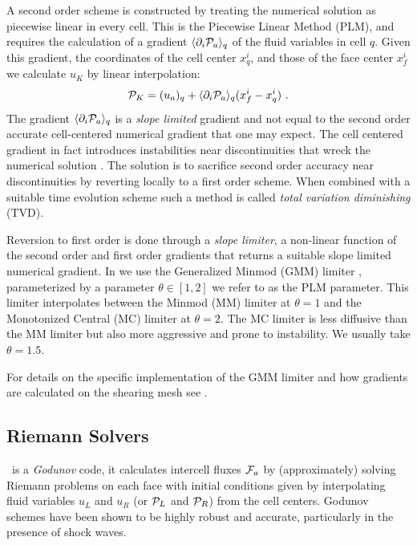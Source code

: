 A second order scheme is constructed by treating the numerical solution as piecewise linear in every cell.  This is the Piecewise Linear Method (PLM), and requires the calculation of a gradient $\langle \partial_i \mathcal{P}_a \rangle_q$ of the fluid variables in cell $q$.  Given this gradient, the coordinates of the cell center $x^i_q$, and those of the face center $x^i_f$ we calculate $u_K$ by linear interpolation:
\begin{equation}
	\PP_K = (u_a)_q + \langle \partial_i \PP_a \rangle_q (x^i_f - x^i_q)\ . \eqlabel{PLM}
\end{equation}
The gradient $\langle \partial_i \mathcal{P}_a \rangle_q$ is a \emph{slope limited} gradient and not equal to the second order accurate cell-centered numerical gradient that one may expect.  The cell centered gradient in fact introduces instabilities near discontinuities that wreck the numerical solution \citep{vanLeer74}.  The solution is to sacrifice second order accuracy near discontinuities by reverting locally to a first order scheme.  When combined with a suitable time evolution scheme such a method is called \emph{total variation diminishing} (TVD).

Reversion to first order is done through a \emph{slope limiter}, a non-linear function of the second order and first order gradients that returns a suitable slope limited numerical gradient.  In \disco we use the Generalized Minmod (GMM) limiter \citep{vanLeer79}, parameterized by a parameter $\theta \in [1,2]$ we refer to as the PLM parameter.  This limiter interpolates between the Minmod (MM) limiter at $\theta=1$ and the Monotonized Central (MC) limiter at $\theta=2$.  The MC limiter is less diffusive than the MM limiter but also more aggressive and prone to instability.  We usually take $\theta=1.5$.  

For details on the specific implementation of the GMM limiter and how gradients are calculated on the shearing mesh see \cite{Duffell16}.

\subsection{Riemann Solvers}

\discogr\ is a \emph{Godunov} code, it calculates intercell fluxes $\mathcal{F}_a$ by (approximately) solving Riemann problems on each face with initial conditions given by interpolating fluid variables $u_L$ and $u_R$ (or $\mathcal{P}_L$ and $\mathcal{P}_R$) from the cell centers.  Godunov schemes have been shown to be highly robust and accurate, particularly in the presence of shock waves.  

